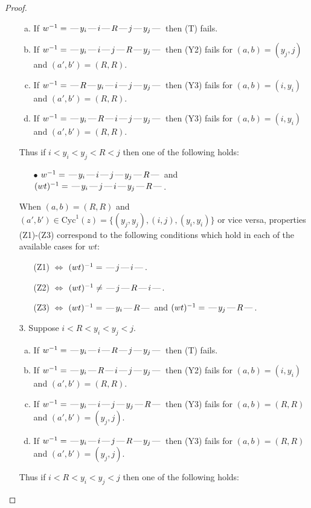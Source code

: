 \documentclass[10pt]{article}
\theoremstyle{definition}
\theoremstyle{definition}
\def\dash{\text{\hspace{0.5mm}---\hspace{0.5mm}}}
\def\Cyc{\mathrm{Cyc}}
\begin{document}
\begin{proof}
\begin{enumerate}
\begin{enumerate}[(a)]
\item If $w^{-1} = \dash y_i\dash i\dash R\dash j\dash y_j\dash $ then (T) fails.
\item If $w^{-1} = \dash y_i\dash i\dash j\dash R\dash y_j\dash $ then (Y2) fails for $(a,b)=(y_j,j)$ and $(a',b')=(R,R)$.
\item If $w^{-1} = \dash R\dash y_i\dash i\dash j\dash y_j\dash $ then (Y3) fails for $(a,b)=(i,y_i)$ and $(a',b')=(R,R)$.
\item If $w^{-1} = \dash y_i\dash R\dash i\dash j\dash y_j\dash $ then (Y3) fails for $(a,b)=(i,y_i)$ and $(a',b')=(R,R)$.
\end{enumerate}
Thus if $i < y_i < y_j < R < j$ then one of the following holds:
\begin{enumerate}
\item[$\bullet$] $w^{-1} = \dash y_i\dash i\dash j\dash y_j\dash R\dash $ and $(wt)^{-1} = \dash y_i\dash j\dash i\dash y_j\dash R\dash $.
\end{enumerate}
When $(a,b)= (R,R)$ and $(a',b')\in \Cyc^1(z)=\{(y_j,y_j),(i,j),(y_i,y_i)\}$ or vice versa,
properties (Z1)-(Z3) correspond to the following conditions which
hold in each of the available cases for $wt$:
\begin{enumerate}
\item[](Z1) $\Leftrightarrow$ $(wt)^{-1} = \dash j \dash i \dash$.
\item[](Z2) $\Leftrightarrow$ $(wt)^{-1} \neq \dash j \dash R \dash i \dash$.
\item[](Z3) $\Leftrightarrow$ $(wt)^{-1} = \dash y_i \dash R \dash$  and $(wt)^{-1} = \dash y_j \dash R \dash$.
\end{enumerate}
\item[$3$.] Suppose $i < R < y_i < y_j < j$.
\begin{enumerate}[(a)]
\item If $w^{-1} = \dash y_i\dash i\dash R\dash j\dash y_j\dash $ then (T) fails.
\item If $w^{-1} = \dash y_i\dash R\dash i\dash j\dash y_j\dash $ then (Y2) fails for $(a,b)=(i,y_i)$ and $(a',b')=(R,R)$.
\item If $w^{-1} = \dash y_i\dash i\dash j\dash y_j\dash R\dash $ then (Y3) fails for $(a,b)=(R,R)$ and $(a',b')=(y_j,j)$.
\item If $w^{-1} = \dash y_i\dash i\dash j\dash R\dash y_j\dash $ then (Y3) fails for $(a,b)=(R,R)$ and $(a',b')=(y_j,j)$.
\end{enumerate}
Thus if $i < R < y_i < y_j < j$ then one of the following holds:

\end{enumerate}
\end{proof}
\end{document}
